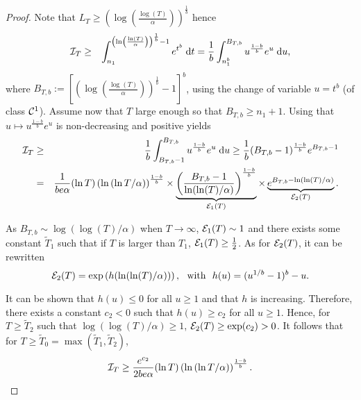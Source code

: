 \documentclass[12pt]{colt2018} %
\begin{document}
\begin{proof}
Note that $L_T \geq \left(\log\left(\frac{\log(T)}{\alpha}\right)\right)^{\frac{1}{b}}$ hence
\begin{eqnarray*}
    \mathcal{I}_T & \geq & \int_{n_1}^{\left(\ln\left(\frac{\ln(T)}{\alpha}\right)\right)^{\frac{1}{b}} - 1} e^{t^b} \;\mathrm{d}t =  \frac{1}{b}\int_{n_1^b}^{B_{T,b}}u^{\frac{1-b}{b}}e^u \;\mathrm{d}u,
\end{eqnarray*}
where $B_{T,b}:=\left[\left(\log\left(\frac{\log(T)}{\alpha}\right)\right)^{\frac{1}{b}} - 1\right]^b$, using the change of variable $u = t^b$ (of class $\mathcal{C}^1$).
Assume now that $T$ large enough so that $B_{T,b} \geq n_1+1$.
Using that $u \mapsto u^{\frac{1-b}{b}}e^u$ is non-decreasing and positive yields
\begin{eqnarray*}
    \mathcal{I}_T & \geq & \frac{1}{b}\int_{B_{T,b}-1}^{B_{T,b}} u^{\frac{1-b}{b}}e^u \;\mathrm{d}u \geq \frac{1}{b}(B_{T,b} - 1)^{\frac{1-b}{b}}e^{B_{T,b} - 1} \\
    & = & \frac{1}{b e \alpha} (\ln T) \left(\ln\left({\ln T}/{\alpha}\right)\right)^{\frac{1-b}{b}} \times \underbrace{\left(\frac{B_{T,b} - 1}{\ln (\ln(T)/\alpha)}\right)^{\frac{1-b}{b}}}_{\mathcal{E}_1(T)} \times \underbrace{e^{B_{T,b}  - \ln (\ln(T)/\alpha)}}_{\mathcal{E}_2(T)}.
\end{eqnarray*}

As $B_{T,b} \sim \log (\log(T)/\alpha)$ when $T \rightarrow \infty$, $\mathcal{E}_1(T) \sim 1$ and there exists some constant $\tilde{T}_1$
such that if $T$ is larger than $T_1$, $\mathcal{E}_1(T) \geq \frac{1}{2}$.
As for $\mathcal{E}_2(T)$, it can be rewritten
\[\mathcal{E}_2(T) = \exp\left(h(\ln(\ln(T)/\alpha))\right), \ \ \text{with} \ \ h(u) = (u^{1/b} - 1)^b - u.\]

It can be shown that $h(u) \leq 0$ for all $u \geq 1$ and that $h$ is increasing.
Therefore, there exists a constant $c_2 < 0$ such that $h(u) \geq c_2$ for all $u \geq 1$.
Hence, for $T \geq \tilde{T}_2$ such that $\log (\log(T)/\alpha) \geq 1$, $\mathcal{E}_2(T) \geq \exp(c_2)>0$.
It follows that for $T \geq \tilde{T}_0 = \max(\tilde{T}_1 ,\tilde{T}_2)$,
\begin{eqnarray*}
    \mathcal{I}_T \geq \frac{e^{c_2}}{2b e \alpha} (\ln T) \left(\ln\left({\ln T}/{\alpha}\right)\right)^{\frac{1-b}{b}}.
\end{eqnarray*}


\end{proof}
\end{document}
